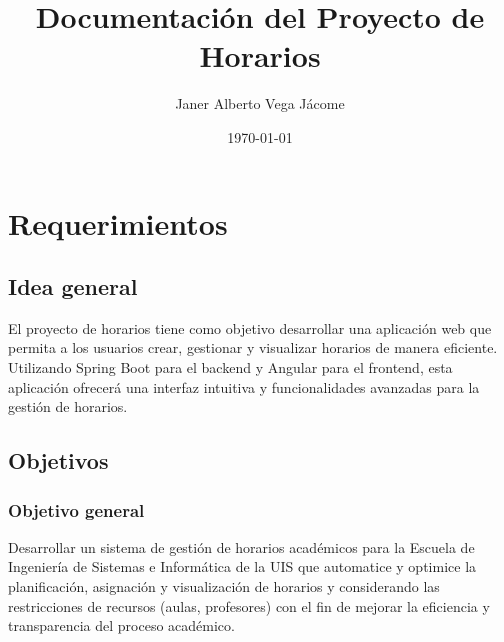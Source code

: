 \documentclass{article} %
\title{Documentación del Proyecto de Horarios}
\author{Janer Alberto Vega Jácome}
\date{\today}
\begin{document}
\maketitle %

\newpage
\section{Requerimientos}
\subsection{Idea general}
\noindent
El proyecto de horarios tiene como objetivo desarrollar una aplicación web que permita a los usuarios crear, gestionar y visualizar horarios de manera eficiente. Utilizando Spring Boot para el backend y Angular para el frontend, esta aplicación ofrecerá una interfaz intuitiva y funcionalidades avanzadas para la gestión de horarios.

\subsection{Objetivos}
    \subsubsection{Objetivo general}
    \noindent
    Desarrollar un sistema de gestión de horarios académicos para la Escuela de Ingeniería de Sistemas e Informática de la UIS que automatice y optimice la planificación, asignación y visualización de horarios y considerando las restricciones de recursos (aulas, profesores) con el fin de mejorar la eficiencia y transparencia del proceso académico.
\end{document}
